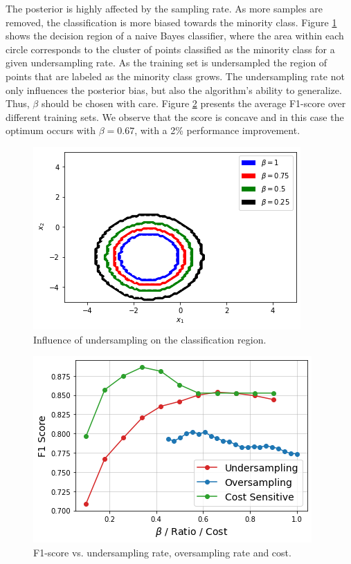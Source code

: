 \documentclass[conference]{IEEEtran}
\begin{document}
		The posterior is highly affected by the sampling rate. As more samples are removed, the classification is more biased towards the minority class. Figure \ref{fig:Undersampling_2D_Contour_Classification} shows the decision region of a naive Bayes classifier, where the area within each circle corresponds to the cluster of points classified as the minority class for a given undersampling rate. As the training set is undersampled the region of points that are labeled as the minority class grows. The undersampling rate not only influences the posterior bias, but also the algorithm's ability to generalize. Thus, $\beta$ should be chosen with care. Figure \ref{fig:F1_Score} presents the average F1-score over different training sets. We observe that the score is concave and in this case the optimum occurs with $\beta=0.67$, with a 2\% performance improvement.

			\begin{figure}[h]
				\includegraphics[scale=0.45]{Undersampling_2D_Contour_Classification}
				\centering
				\caption{Influence of undersampling on the classification region.}
				\label{fig:Undersampling_2D_Contour_Classification}
			\end{figure}
		
		\begin{figure}[h]
			\includegraphics[scale=0.45]{F1_scores_dataset1}
			\centering
			\caption{F1-score vs. undersampling rate, oversampling rate and cost.}
			\label{fig:F1_Score}
		\end{figure}
		
\end{document}
